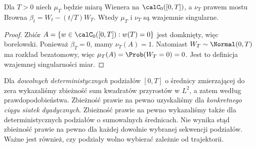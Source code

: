 \begin{stwierdzenie}
Dla $T>0$ niech $\mu_T$ będzie miarą Wienera na
$\calC_0([0,T])$, a $\nu_T$ prawem mostu Browna
$\beta_t=W_t-(t/T)W_T$. Wtedy $\mu_T$ i $\nu_T$
są wzajemnie singularne.
\end{stwierdzenie}
\begin{proof}
Zbiór $A=\{w\in\calC_0([0,T]):w(T)=0\}$ jest domknięty,
więc borelowski. Ponieważ $\beta_T=0$, mamy $\nu_T(A)=1$.
Natomiast $W_T\sim\Normal(0,T)$ ma rozkład bezatomowy,
więc $\mu_T(A)=\Prob(W_T=0)=0$. Jest to definicja
wzajemnej singularności miar.
\end{proof}

\begin{uwaga}
Dla \emph{dowolnych deterministycznych} podziałów
$[0,T]$ o średnicy zmierzającej do zera wykazaliśmy
zbieżność sum kwadratów przyrostów w $L^2$, a zatem
według prawdopodobieństwa. Zbieżność prawie na pewno
uzyskaliśmy dla \emph{konkretnego ciągu siatek dyadycznych}.
Zbieżność prawie na pewno wykazaliśmy także dla
deterministycznych podziałów o sumowalnych średnicach.
Nie wynika stąd zbieżność prawie na pewno dla każdej
dowolnie wybranej sekwencji podziałów. Ważne jest również,
czy podziały wolno wybierać zależnie od trajektorii.
\end{uwaga}

